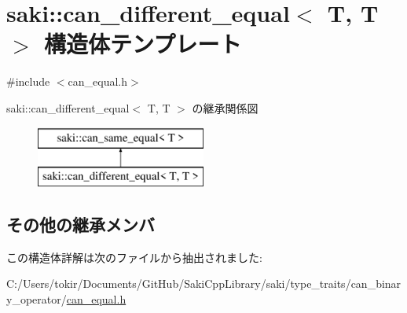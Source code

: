 \hypertarget{structsaki_1_1can__different__equal_3_01_t_00_01_t_01_4}{}\section{saki\+:\+:can\+\_\+different\+\_\+equal$<$ T, T $>$ 構造体テンプレート}
\label{structsaki_1_1can__different__equal_3_01_t_00_01_t_01_4}


{\ttfamily \#include $<$can\+\_\+equal.\+h$>$}

saki\+:\+:can\+\_\+different\+\_\+equal$<$ T, T $>$ の継承関係図\begin{figure}[H]
\begin{center}
\leavevmode
\includegraphics[height=2.000000cm]{structsaki_1_1can__different__equal_3_01_t_00_01_t_01_4}
\end{center}
\end{figure}
\subsection*{その他の継承メンバ}


この構造体詳解は次のファイルから抽出されました\+:\begin{DoxyCompactItemize}
\item 
C\+:/\+Users/tokir/\+Documents/\+Git\+Hub/\+Saki\+Cpp\+Library/saki/type\+\_\+traits/can\+\_\+binary\+\_\+operator/\mbox{\hyperlink{can__equal_8h}{can\+\_\+equal.\+h}}\end{DoxyCompactItemize}

